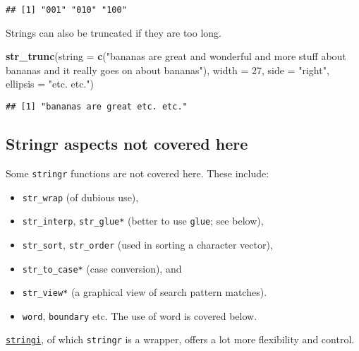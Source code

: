 \documentclass[
]{book}
\newenvironment{Shaded}{}{}
\newcommand{\DataTypeTok}[1]{\textcolor[rgb]{0.56,0.13,0.00}{#1}}
\newcommand{\DecValTok}[1]{\textcolor[rgb]{0.25,0.63,0.44}{#1}}
\newcommand{\KeywordTok}[1]{\textcolor[rgb]{0.00,0.44,0.13}{\textbf{#1}}}
\newcommand{\NormalTok}[1]{#1}
\newcommand{\StringTok}[1]{\textcolor[rgb]{0.25,0.44,0.63}{#1}}
\begin{document}
\begin{verbatim}
## [1] "001" "010" "100"
\end{verbatim}

Strings can also be truncated if they are too long.

\begin{Shaded}
\begin{Highlighting}[]
\KeywordTok{str_trunc}\NormalTok{(}\DataTypeTok{string =} \KeywordTok{c}\NormalTok{(}\StringTok{"bananas are great and wonderful}
\StringTok{                     and more stuff about bananas and}
\StringTok{                     it really goes on about bananas"}\NormalTok{),}
          \DataTypeTok{width =} \DecValTok{27}\NormalTok{,}
          \DataTypeTok{side =} \StringTok{"right"}\NormalTok{, }\DataTypeTok{ellipsis =} \StringTok{"etc. etc."}\NormalTok{)}
\end{Highlighting}
\end{Shaded}

\begin{verbatim}
## [1] "bananas are great etc. etc."
\end{verbatim}

\hypertarget{stringr-aspects-not-covered-here}{%
\subsection{Stringr aspects not covered here}\label{stringr-aspects-not-covered-here}}

Some \texttt{stringr} functions are not covered here. These include:

\begin{itemize}
\item
  \texttt{str\_wrap} (of dubious use),
\item
  \texttt{str\_interp}, \texttt{str\_glue*} (better to use \texttt{glue}; see below),
\item
  \texttt{str\_sort}, \texttt{str\_order} (used in sorting a character vector),
\item
  \texttt{str\_to\_case*} (case conversion), and
\item
  \texttt{str\_view*} (a graphical view of search pattern matches).
\item
  \texttt{word}, \texttt{boundary} etc. The use of word is covered below.
\end{itemize}

\href{https://cran.r-project.org/web/packages/stringi/}{\texttt{stringi}}, of which \texttt{stringr} is a wrapper, offers a lot more flexibility and control.
\end{document}
